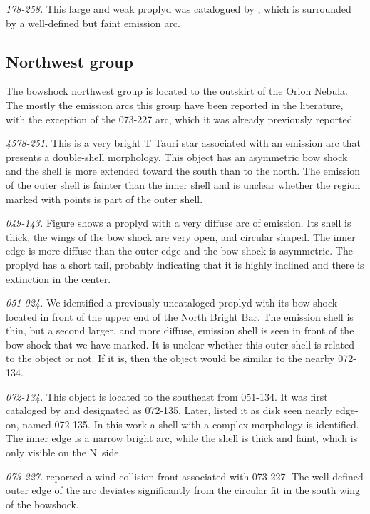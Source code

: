 \documentclass[apj, twocolumn]{aastex63}
\renewcommand\clearpage{}
\begin{document}
\textit{178-258.}  This large and weak proplyd was catalogued
by \citet{Ricci:2008a}, which is surrounded by a well-defined
but faint emission arc.

\clearpage
\subsection{Northwest group}
\label{sec:nw-group}



The bowshock northwest group is located to the outskirt of
the Orion Nebula. The mostly the emission arcs this group
have been reported in the literature, with the exception
of the  073-227 arc, which it was already previously reported.    

\textit{4578-251.} This is a very bright T Tauri star
associated with an emission arc that presents a double-shell
morphology. This object has an asymmetric bow shock and
the shell is more extended toward the south than to the north.
The emission of the outer shell is fainter than the inner
shell and is unclear whether the region marked with points
is part of the outer shell.

\textit{049-143.} Figure shows a proplyd \citep{Ricci:2008a}
with a very diffuse arc of emission. Its shell is thick,
the wings of the bow shock are very open, and circular
shaped. The inner edge is more diffuse than the outer edge
and the bow shock is asymmetric. The  proplyd has a short
tail, probably indicating that it is highly inclined and
there is extinction in the center. 
 
\textit{051-024.} We identified a previously uncataloged
proplyd with its bow shock located in front of the upper
end of the North Bright Bar. The emission shell is thin,
but a second larger, and more diffuse, emission shell is
seen in front of the bow shock that we have
marked. It is unclear whether this outer shell is related
to the object or not. If it is, then the object would be
similar to the nearby 072-134. 

\textit{072-134.} This object is located to the southeast
from 051-134. It was first cataloged by \citet{ODell:1996a}
and designated as 072-135. Later, \citet{Ricci:2008a} listed
it as disk seen nearly edge-on, named 072-135. In this work
a shell with a complex morphology is identified. The inner
edge is a narrow bright arc, while the shell is thick and
faint, which is only visible on the N~side.                 

\textit{073-227.} \citet{Bally:2000a} reported a wind
collision front associated with 073-227. The well-defined
outer edge of the arc deviates significantly from the
circular fit in the south wing of the bowshock.
   
\end{document}
